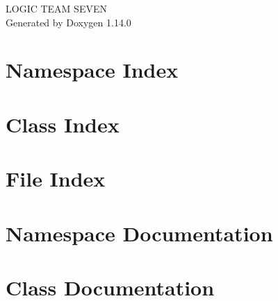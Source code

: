 \documentclass[twoside]{book}
\newcommand{\+}{\discretionary{\mbox{\scriptsize$\hookleftarrow$}}{}{}}
\newcommand{\clearemptydoublepage}{%
    \newpage{\pagestyle{empty}\cleardoublepage}%
  }
\begin{document}
  \raggedbottom
    \hypersetup{pageanchor=false,
                bookmarksnumbered=true,
                pdfencoding=unicode
               }
  \begin{titlepage}
  \vspace*{7cm}
  \begin{center}%
  {\Large LOGIC TEAM SEVEN}\\
  \vspace*{1cm}
  {\large Generated by Doxygen 1.14.0}\\
  \end{center}
  \end{titlepage}
  \clearemptydoublepage
  \tableofcontents
  \clearemptydoublepage
  \hypersetup{pageanchor=true}
\chapter{Namespace Index}

\chapter{Class Index}

\chapter{File Index}

\chapter{Namespace Documentation}

\chapter{Class Documentation}

\end{document}
